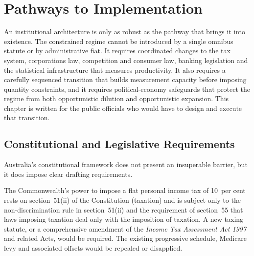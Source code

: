 \documentclass[12pt,anyside]{book}
\theoremstyle{definition}
\theoremstyle{plain}
\theoremstyle{remark}
\begin{document}

\chapter{Pathways to Implementation}
\label{ch:implementation}

An institutional architecture is only as robust as the pathway that brings it into existence. The constrained regime cannot be introduced by a single omnibus statute or by administrative fiat. It requires coordinated changes to the tax system, corporations law, competition and consumer law, banking legislation and the statistical infrastructure that measures productivity. It also requires a carefully sequenced transition that builds measurement capacity before imposing quantity constraints, and it requires political-economy safeguards that protect the regime from both opportunistic dilution and opportunistic expansion. This chapter is written for the public officials who would have to design and execute that transition.

\section{Constitutional and Legislative Requirements}

Australia’s constitutional framework does not present an insuperable barrier, but it does impose clear drafting requirements.

The Commonwealth’s power to impose a flat personal income tax of 10~per cent rests on section~51(ii) of the Constitution (taxation) and is subject only to the non-discrimination rule in section~51(ii) and the requirement of section~55 that laws imposing taxation deal only with the imposition of taxation. A new taxing statute, or a comprehensive amendment of the \textit{Income Tax Assessment Act 1997} and related Acts, would be required. The existing progressive schedule, Medicare levy and associated offsets would be repealed or disapplied.
\end{document}
